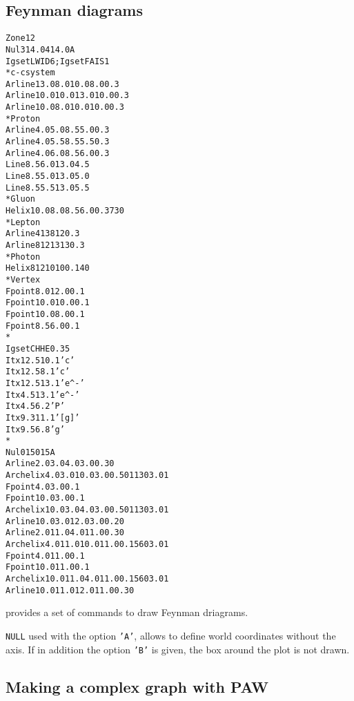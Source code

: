 \clearpage
\subsection{Feynman diagrams}

\begin{alltt}
      Zone 1 2
     Nul 3 14.0 4 14.0 A
      Igset LWID 6 ; Igset FAIS 1
      * c-c system
     Arline  13.0  8.0 10.0  8.0 0.3
      Arline  10.0 10.0 13.0 10.0 0.3
      Arline  10.0  8.0 10.0 10.0 0.3
      * Proton
      Arline 4.0 5.0  8.5 5.0 0.3
      Arline 4.0 5.5  8.5 5.5 0.3
      Arline 4.0 6.0  8.5 6.0 0.3
      Line   8.5 6.0 13.0 4.5
      Line   8.5 5.0 13.0 5.0
      Line   8.5 5.5 13.0 5.5
      * Gluon
     Helix 10.0 8.0 8.5 6.0 0.3 7 30
      * Lepton
      Arline 4 13  8 12 0.3
      Arline 8 12 13 13 0.3
      * Photon
      Helix 8 12 10 10 0.1 4 0
      * Vertex
     Fpoint  8.0 12.0 0.1
      Fpoint 10.0 10.0 0.1
      Fpoint 10.0  8.0 0.1
      Fpoint  8.5  6.0 0.1
      *
      Igset CHHE 0.35
      Itx 12.5 10.1 'c'
      Itx 12.5  8.1 'c'
      Itx 12.5 13.1 'e^-'
      Itx  4.5 13.1 'e^-'
      Itx  4.5  6.2 'P'
      Itx  9.3 11.1 '[g]'
      Itx  9.5  6.8 'g'
      *
     Nul 0 15 0 15 A        
      Arline    2.0  3.0  4.0  3.0 0.30
     Archelix  4.0  3.0 10.0  3.0 0.50 11 30 3.01
      Fpoint    4.0  3.0  0.1
      Fpoint   10.0  3.0  0.1
      Archelix 10.0  3.0  4.0  3.0 0.50 11 30 3.01
      Arline   10.0  3.0 12.0  3.0 0.20
      Arline    2.0 11.0  4.0 11.0 0.30
      Archelix  4.0 11.0 10.0 11.0 0.15  6  0 3.01
      Fpoint    4.0 11.0  0.1
      Fpoint   10.0 11.0  0.1
      Archelix 10.0 11.0  4.0 11.0 0.15  6  0 3.01
      Arline   10.0 11.0 12.0 11.0 0.30
\end{alltt} 
\begin{DinglistE}
\item \PAW{} provides a set of commands to draw Feynman driagrams.
\item \texttt{NULL} used with the option \texttt{'A'}, allows to define
      world coordinates without the axis. If in addition the option
      \texttt{'B'} is given, the box around the plot is not drawn.
\end{DinglistE}

\clearpage

\subsection{Making a complex graph with PAW}
